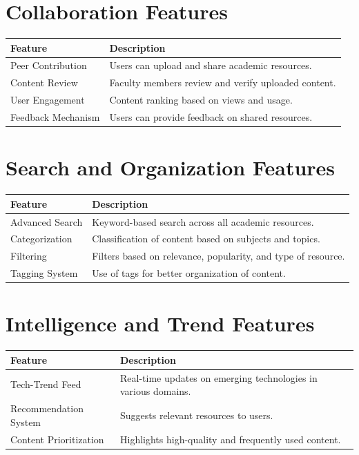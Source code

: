 \documentclass[12pt,a4paper]{report}
\begin{document}
\section{Collaboration Features}

\begin{center}
\begin{tabular}{|l|p{8cm}|}
\hline
Feature & Description \\
\hline
Peer Contribution & Users can upload and share academic resources. \\
\hline
Content Review & Faculty members review and verify uploaded content. \\
\hline
User Engagement & Content ranking based on views and usage. \\
\hline
Feedback Mechanism & Users can provide feedback on shared resources. \\
\hline
\end{tabular}
\end{center}

\section{Search and Organization Features}

\begin{center}
\begin{tabular}{|l|p{8cm}|}
\hline
Feature & Description \\
\hline
Advanced Search & Keyword-based search across all academic resources. \\
\hline
Categorization & Classification of content based on subjects and topics. \\
\hline
Filtering & Filters based on relevance, popularity, and type of resource. \\
\hline
Tagging System & Use of tags for better organization of content. \\
\hline
\end{tabular}
\end{center}

\section{Intelligence and Trend Features}

\begin{center}
\begin{tabular}{|l|p{8cm}|}
\hline
Feature & Description \\
\hline
Tech-Trend Feed & Real-time updates on emerging technologies in various domains. \\
\hline
Recommendation System & Suggests relevant resources to users. \\
\hline
Content Prioritization & Highlights high-quality and frequently used content. \\
\hline
\end{tabular}
\end{center}
\end{document}
